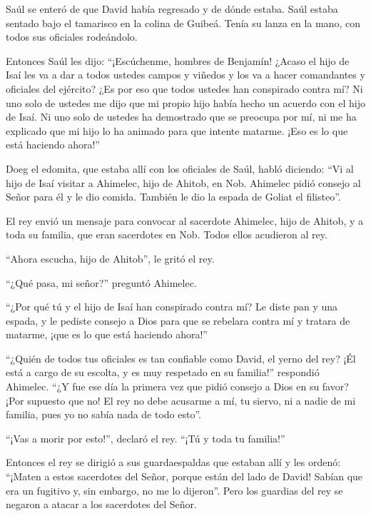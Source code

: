  Saúl se enteró de que David había regresado y de dónde
estaba. Saúl estaba sentado bajo el tamarisco en la colina de Guibeá.
Tenía su lanza en la mano, con todos sus oficiales rodeándolo.

 Entonces Saúl les dijo: ``¡Escúchenme, hombres de Benjamín!
¿Acaso el hijo de Isaí les va a dar a todos ustedes campos y viñedos y
los va a hacer comandantes y oficiales del ejército?  ¿Es
por eso que todos ustedes han conspirado contra mí? Ni uno solo de
ustedes me dijo que mi propio hijo había hecho un acuerdo con el hijo de
Isaí. Ni uno solo de ustedes ha demostrado que se preocupa por mí, ni me
ha explicado que mi hijo lo ha animado para que intente matarme. ¡Eso es
lo que está haciendo ahora!''

 Doeg el edomita, que estaba allí con los oficiales de Saúl,
habló diciendo: ``Vi al hijo de Isaí visitar a Ahimelec, hijo de Ahitob,
en Nob.  Ahimelec pidió consejo al Señor para él y le dio
comida. También le dio la espada de Goliat el filisteo''.

 El rey envió un mensaje para convocar al sacerdote
Ahimelec, hijo de Ahitob, y a toda su familia, que eran sacerdotes en
Nob. Todos ellos acudieron al rey.

 ``Ahora escucha, hijo de Ahitob'', le gritó el rey.

``¿Qué pasa, mi señor?'' preguntó Ahimelec.

 ``¿Por qué tú y el hijo de Isaí han conspirado contra mí?
Le diste pan y una espada, y le pediste consejo a Dios para que se
rebelara contra mí y tratara de matarme, ¡que es lo que está haciendo
ahora!''

 ``¿Quién de todos tus oficiales es tan confiable como
David, el yerno del rey? ¡Él está a cargo de su escolta, y es muy
respetado en su familia!'' respondió Ahimelec.  ``¿Y fue
ese día la primera vez que pidió consejo a Dios en su favor? ¡Por
supuesto que no! El rey no debe acusarme a mí, tu siervo, ni a nadie de
mi familia, pues yo no sabía nada de todo esto''.

 ``¡Vas a morir por esto!'', declaró el rey. ``¡Tú y toda
tu familia!''

 Entonces el rey se dirigió a sus guardaespaldas que
estaban allí y les ordenó: ``¡Maten a estos sacerdotes del Señor, porque
están del lado de David! Sabían que era un fugitivo y, sin embargo, no
me lo dijeron''. Pero los guardias del rey se negaron a atacar a los
sacerdotes del Señor.


